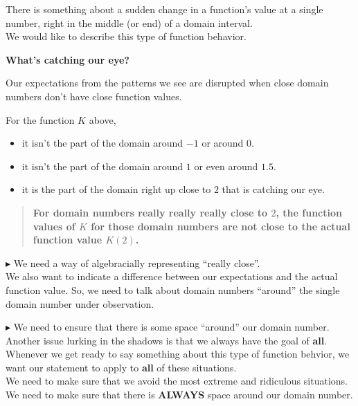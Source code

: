 \documentclass{ximera}
\begin{document}
There is something about a sudden change in a function's value at a single number, right in the middle (or end) of a domain interval.\\

We would like to describe this type of function behavior. \\



\begin{idea}  \textbf{\textcolor{purple!85!blue}{What's catching our eye?}}


Our expectations from the patterns we see are disrupted when close domain numbers don't have close function values.


\end{idea}


For the function $K$ above, 

\begin{itemize}
\item it isn't the part of the domain around $-1$ or around $0$.  
\item it isn't the part of the domain around $1$ or even around $1.5$. 
\item it is the part of the domain right up close to $2$ that is catching our eye.
\end{itemize}


\begin{quote}
 \textbf{\textcolor{blue!55!black}{For domain numbers really really really close to $2$, the function values of $K$ for those domain numbers are not close to the actual function value $K(2)$.}} 
\end{quote}







\textbf{\textcolor{red!90!darkgray}{$\blacktriangleright$}} We need a way of algebracially representing ``really close''.  \\


We also want to indicate a difference between our expectations and the actual function value. So, we need to talk about domain numbers ``around'' the single domain number under observation. 


\textbf{\textcolor{red!90!darkgray}{$\blacktriangleright$}} We need to ensure that there is some space ``around'' our domain number. \\





Another issue lurking in the shadows is that we always have the goal of \textbf{\textcolor{red!80!black}{all}}. Whenever we get ready to say something about this type of function behvior, we want our statement to apply to \textbf{\textcolor{red!80!black}{all}} of these situations. \\

We need to make sure that we avoid the most extreme and ridiculous situations.  We need to make sure that there is \textbf{\textcolor{red!80!black}{ALWAYS}} space around our domain number.
\end{document}
